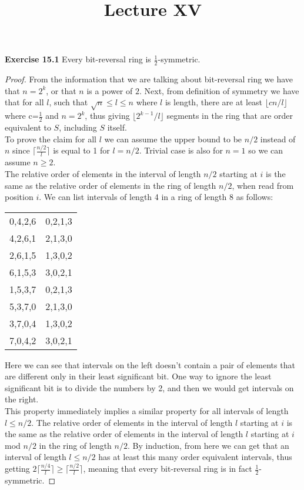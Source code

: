 \documentclass[a4paper]{article}
\title{\vspace{-2cm}Lecture XV\vspace{-2cm}}
\date{}
\begin{document}
\maketitle
\noindent \textbf{Exercise 15.1}  Every bit-reversal ring is $\frac{1}{2}$-symmetric.
\begin{proof}
From the information that we are talking about bit-reversal ring we have that $n=2^{k}$, or that $n$ is a power of $2$. Next, from definition of symmetry we have that for all $l$, such that $\sqrt{n} \leq l \leq n$ where $l$ is length, there are at least $\lfloor cn/l \rfloor$ where c=$\frac{1}{2}$ and $n=2^{k}$, thus giving $\lfloor 2^{k-1}/l \rfloor$ segments in the ring that are order equivalent to $S$, including $S$ itself.\\
To prove the claim for all $l$ we can assume the upper bound to be $n/2$ instead of $n$ since $\lceil \frac{n/2}{l} \rceil$ is equal to 1 for $l=n/2$. Trivial case is also for $n=1$ so we can assume $n \geq 2$.\\
The relative order of elements in the interval of length $n/2$ starting at $i$ is the same as the relative order of elements in the ring of length $n/2$, when read from position $i$. We can list intervals of length 4 in a ring of length 8 as follows:
\begin{center}
\begin{tabular}{ c c }
0,4,2,6 & 0,2,1,3 \\
4,2,6,1 & 2,1,3,0 \\
2,6,1,5 & 1,3,0,2 \\
6,1,5,3 & 3,0,2,1 \\
1,5,3,7 & 0,2,1,3 \\
5,3,7,0 & 2,1,3,0 \\
3,7,0,4 & 1,3,0,2 \\
7,0,4,2 & 3,0,2,1
\end{tabular}
\end{center}
Here we can see that intervals on the left doesn't contain a pair of elements that are different only in their least significant bit. One way to ignore the least significant bit is to divide the numbers by 2, and then we would get intervals on the right.\\
This property immediately implies a similar property for all intervals of length $l \leq n/2$. The relative order of elements in the interval of length $l$ starting at $i$ is the same as the relative order of elements in the interval of length $l$ starting at $i$ mod $n/2$ in the ring of length $n/2$. By induction, from here we can get that an interval of length $l \leq n/2$ has at least this many order equivalent intervals, thus getting $2\lceil \frac{n/4}{l} \rceil \geq \lceil \frac{n/2}{l} \rceil$, meaning that every bit-reversal ring is in fact $\frac{1}{2}$-symmetric.
\end{proof}
\end{document}
